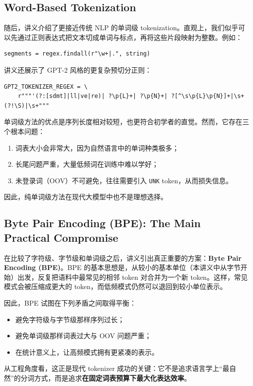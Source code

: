 \documentclass[a4paper,UTF8]{article}
\numberwithin{equation}{section}
\begin{document}
\subsection{Word-Based Tokenization}

随后，讲义介绍了更接近传统 NLP 的单词级 tokenization。直观上，我们似乎可以先通过正则表达式把文本切成单词与标点，再将这些片段映射为整数。例如：

\begin{verbatim}
segments = regex.findall(r"\w+|.", string)
\end{verbatim}

讲义还展示了 GPT-2 风格的更复杂预切分正则：

\begin{verbatim}
GPT2_TOKENIZER_REGEX = \
    r"""'(?:[sdmt]|ll|ve|re)| ?\p{L}+| ?\p{N}+| ?[^\s\p{L}\p{N}]+|\s+(?!\S)|\s+"""
\end{verbatim}

单词级方法的优点是序列长度相对较短，也更符合初学者的直觉。然而，它存在三个根本问题：
\begin{enumerate}
    \item 词表大小会非常大，因为自然语言中的单词种类极多；
    \item 长尾问题严重，大量低频词在训练中难以学好；
    \item 未登录词（OOV）不可避免，往往需要引入 \verb|UNK| token，从而损失信息。
\end{enumerate}
因此，纯单词级方法在现代大模型中也不是理想选择。

\subsection{Byte Pair Encoding (BPE): The Main Practical Compromise}

在比较了字符级、字节级和单词级之后，讲义引出真正重要的方案：\textbf{Byte Pair Encoding (BPE)}。BPE 的基本思想是，从较小的基本单位（本讲义中从字节开始）出发，反复把语料中最常见的相邻 token 对合并为一个新 token。这样，常见模式会被压缩成更大的 token，而低频模式仍然可以退回到较小单位表示。

因此，BPE 试图在下列矛盾之间取得平衡：
\begin{itemize}
    \item 避免字符级与字节级那样序列过长；
    \item 避免单词级那样词表过大与 OOV 问题严重；
    \item 在统计意义上，让高频模式拥有更紧凑的表示。
\end{itemize}
从工程角度看，这正是现代 tokenizer 成功的关键：它不是追求语言学上“最自然”的分词方式，而是追求\textbf{在固定词表预算下最大化表达效率}。
\end{document}
